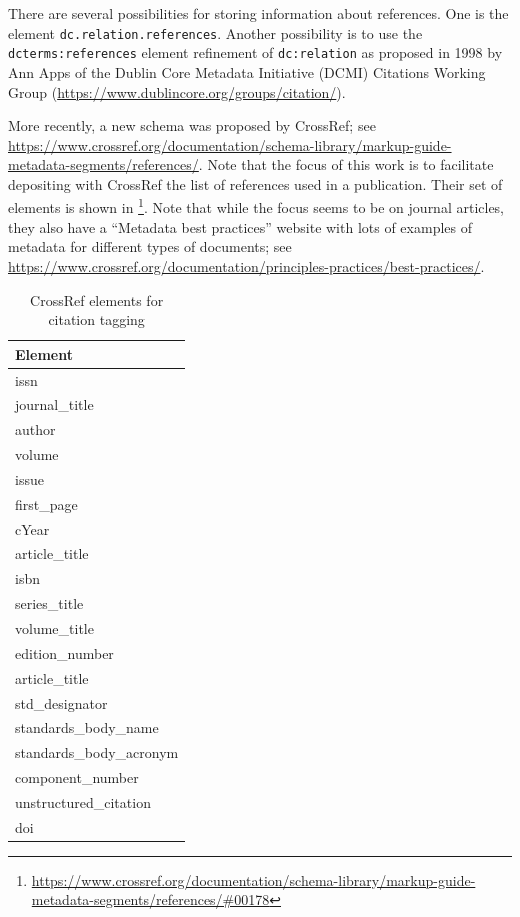 \documentclass[12pt, twoside]{article}
\begin{document}
There are several possibilities for storing information about references. One is the element \texttt{dc.relation.references}. Another possibility is to use the \texttt{dcterms:references} element refinement of \texttt{dc:relation} as proposed in 1998 by Ann Apps of the Dublin Core Metadata Initiative (DCMI) Citations Working Group (\url{https://www.dublincore.org/groups/citation/}).

More recently, a new schema was proposed by CrossRef; see \url{https://www.crossref.org/documentation/schema-library/markup-guide-metadata-segments/references/}. Note that the focus of this work is to facilitate depositing with CrossRef the list of references used in a publication. Their set of elements is shown in \footnote{\url{https://www.crossref.org/documentation/schema-library/markup-guide-metadata-segments/references/\#00178}}. Note that while the focus seems to be on journal articles, they also have a \enquote{Metadata best practices} website with lots of examples of metadata for different types of documents; see \url{https://www.crossref.org/documentation/principles-practices/best-practices/}.

\begin{table}[!ht]
    \caption{CrossRef elements for citation tagging}
    \label{tab:crossRefElementsForCitationTagging}
    \begin{tabular}{l}
      \textbf{Element}\\
      \hline
issn\\
journal\_title\\
author\\
volume\\
issue\\
first\_page\\
cYear\\
article\_title\\
isbn\\
series\_title\\
volume\_title\\
edition\_number\\
article\_title\\
std\_designator\\
standards\_body\_name\\
standards\_body\_acronym\\
component\_number\\
unstructured\_citation\\
doi\\
\end{tabular}
\end{table}
\end{document}

